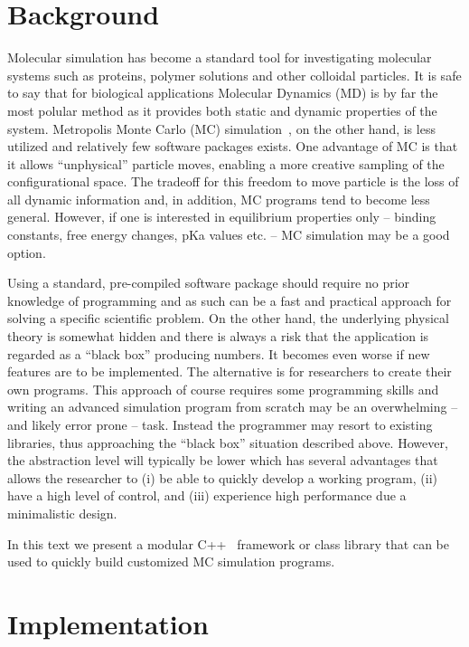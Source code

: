\documentclass[10pt]{bmc_article}
\newenvironment{bmcformat}{\fussy\setboolean{publ}{true}}{\fussy}
\begin{document}
\begin{bmcformat}
\section*{Background}
Molecular simulation has become a standard tool for investigating molecular systems such as proteins, polymer solutions and other colloidal particles.
It is safe to say that for biological applications Molecular Dynamics (MD) is by far the most polular method as it provides both static and dynamic properties of the system.
Metropolis Monte Carlo (MC) simulation~\cite{metropolis:53}, on the other hand, is less utilized and relatively few software packages exists\cite{Kamberaj:2001fk,carlsson:01,Jie-Hu:2006lr}.
One advantage of MC is that it allows ``unphysical'' particle moves, enabling a more creative sampling of the configurational space\cite{frenkel}. The tradeoff for this freedom to move particle is the loss of all dynamic information and, in addition, MC programs tend to become less general.
However, if one is interested in equilibrium properties only -- binding constants, free energy changes, pKa values etc. -- MC simulation may be a good option.

Using a standard, pre-compiled software package should require no prior knowledge of programming and as such can be a fast and practical approach for solving a specific scientific problem. On the other hand, the underlying physical theory is somewhat hidden and there is always a risk that the application is regarded as a ``black box'' producing numbers. It becomes even worse if new features are to be implemented.
The alternative is for researchers to create their own programs. This approach of course requires some programming skills and writing an advanced simulation program from scratch may be an overwhelming -- and likely error prone -- task.
Instead the programmer may resort to existing libraries, thus approaching the ``black box'' situation described above. However, the abstraction level will typically be lower which has several advantages that allows the researcher to
(i) be able to quickly develop a working program,
(ii) have a high level of control, and
(iii) experience high performance due a minimalistic design.

In this text we present a modular C++~\cite{stroustrup:97} framework or class library that can be used to quickly build customized MC simulation programs.

%
\section*{Implementation}

\end{bmcformat}
\end{document}
